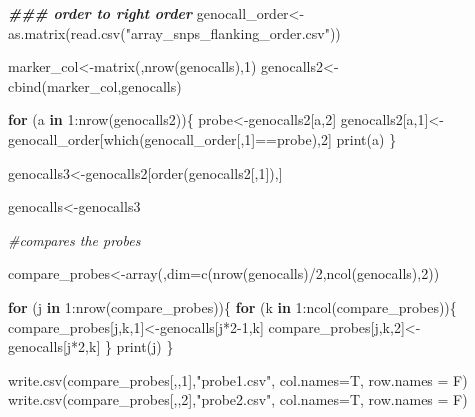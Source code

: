 \documentclass[
]{article}
\newenvironment{Shaded}{\begin{snugshade}}{\end{snugshade}}
\newcommand{\AttributeTok}[1]{\textcolor[rgb]{0.77,0.63,0.00}{#1}}
\newcommand{\CommentTok}[1]{\textcolor[rgb]{0.56,0.35,0.01}{\textit{#1}}}
\newcommand{\ControlFlowTok}[1]{\textcolor[rgb]{0.13,0.29,0.53}{\textbf{#1}}}
\newcommand{\DecValTok}[1]{\textcolor[rgb]{0.00,0.00,0.81}{#1}}
\newcommand{\DocumentationTok}[1]{\textcolor[rgb]{0.56,0.35,0.01}{\textbf{\textit{#1}}}}
\newcommand{\FunctionTok}[1]{\textcolor[rgb]{0.00,0.00,0.00}{#1}}
\newcommand{\NormalTok}[1]{#1}
\newcommand{\OtherTok}[1]{\textcolor[rgb]{0.56,0.35,0.01}{#1}}
\newcommand{\SpecialCharTok}[1]{\textcolor[rgb]{0.00,0.00,0.00}{#1}}
\newcommand{\StringTok}[1]{\textcolor[rgb]{0.31,0.60,0.02}{#1}}
\begin{document}
\begin{Shaded}
\begin{Highlighting}[]
\DocumentationTok{\#\#\# order to right order}
\NormalTok{genocall\_order}\OtherTok{\textless{}{-}}\FunctionTok{as.matrix}\NormalTok{(}\FunctionTok{read.csv}\NormalTok{(}\StringTok{"array\_snps\_flanking\_order.csv"}\NormalTok{))}

\NormalTok{marker\_col}\OtherTok{\textless{}{-}}\FunctionTok{matrix}\NormalTok{(,}\FunctionTok{nrow}\NormalTok{(genocalls),}\DecValTok{1}\NormalTok{)}
\NormalTok{genocalls2}\OtherTok{\textless{}{-}}\FunctionTok{cbind}\NormalTok{(marker\_col,genocalls)}

\ControlFlowTok{for}\NormalTok{ (a }\ControlFlowTok{in} \DecValTok{1}\SpecialCharTok{:}\FunctionTok{nrow}\NormalTok{(genocalls2))\{}
\NormalTok{  probe}\OtherTok{\textless{}{-}}\NormalTok{genocalls2[a,}\DecValTok{2}\NormalTok{]}
\NormalTok{  genocalls2[a,}\DecValTok{1}\NormalTok{]}\OtherTok{\textless{}{-}}\NormalTok{genocall\_order[}\FunctionTok{which}\NormalTok{(genocall\_order[,}\DecValTok{1}\NormalTok{]}\SpecialCharTok{==}\NormalTok{probe),}\DecValTok{2}\NormalTok{]}
  \FunctionTok{print}\NormalTok{(a)}
\NormalTok{\}}

\NormalTok{genocalls3}\OtherTok{\textless{}{-}}\NormalTok{genocalls2[}\FunctionTok{order}\NormalTok{(genocalls2[,}\DecValTok{1}\NormalTok{]),]}

\NormalTok{genocalls}\OtherTok{\textless{}{-}}\NormalTok{genocalls3}


\CommentTok{\#compares the probes}

\NormalTok{compare\_probes}\OtherTok{\textless{}{-}}\FunctionTok{array}\NormalTok{(,}\AttributeTok{dim=}\FunctionTok{c}\NormalTok{(}\FunctionTok{nrow}\NormalTok{(genocalls)}\SpecialCharTok{/}\DecValTok{2}\NormalTok{,}\FunctionTok{ncol}\NormalTok{(genocalls),}\DecValTok{2}\NormalTok{))}

\ControlFlowTok{for}\NormalTok{ (j }\ControlFlowTok{in} \DecValTok{1}\SpecialCharTok{:}\FunctionTok{nrow}\NormalTok{(compare\_probes))\{}
  \ControlFlowTok{for}\NormalTok{ (k }\ControlFlowTok{in} \DecValTok{1}\SpecialCharTok{:}\FunctionTok{ncol}\NormalTok{(compare\_probes))\{}
\NormalTok{    compare\_probes[j,k,}\DecValTok{1}\NormalTok{]}\OtherTok{\textless{}{-}}\NormalTok{genocalls[j}\SpecialCharTok{*}\DecValTok{2{-}1}\NormalTok{,k]}
\NormalTok{    compare\_probes[j,k,}\DecValTok{2}\NormalTok{]}\OtherTok{\textless{}{-}}\NormalTok{genocalls[j}\SpecialCharTok{*}\DecValTok{2}\NormalTok{,k]}
\NormalTok{    \} }
  \FunctionTok{print}\NormalTok{(j)}
\NormalTok{\}}

\FunctionTok{write.csv}\NormalTok{(compare\_probes[,,}\DecValTok{1}\NormalTok{],}\StringTok{"probe1.csv"}\NormalTok{, }\AttributeTok{col.names=}\NormalTok{T, }\AttributeTok{row.names =}\NormalTok{ F)}
\FunctionTok{write.csv}\NormalTok{(compare\_probes[,,}\DecValTok{2}\NormalTok{],}\StringTok{"probe2.csv"}\NormalTok{, }\AttributeTok{col.names=}\NormalTok{T, }\AttributeTok{row.names =}\NormalTok{ F)}



\end{Highlighting}
\end{Shaded}
\end{document}
